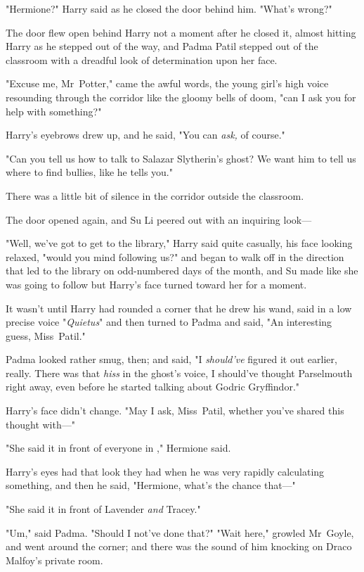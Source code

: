 "Hermione?" Harry said as he closed the door behind him. "What's wrong?"

The door flew open behind Harry not a moment after he closed it, almost hitting
Harry as he stepped out of the way, and Padma Patil stepped out of the
classroom with a dreadful look of determination upon her face.

"Excuse me, Mr~Potter," came the awful words, the young girl's high voice
resounding through the corridor like the gloomy bells of doom, "can I ask you
for help with something?"

Harry's eyebrows drew up, and he said, "You can \emph{ask,} of course."

"Can you tell us how to talk to Salazar Slytherin's ghost? We want him to tell
us where to find bullies, like he tells you."

There was a little bit of silence in the corridor outside the classroom.

The door opened again, and Su Li peered out with an inquiring look—

"Well, we've got to get to the library," Harry said quite casually, his face
looking relaxed, "would you mind following us?" and began to walk off in the
direction that led to the library on odd-numbered days of the month, and Su
made like she was going to follow but Harry's face turned toward her for a
moment.

It wasn't until Harry had rounded a corner that he drew his wand, said in a low
precise voice "\emph{Quietus}" and then turned to Padma and said, "An
interesting guess, Miss~Patil."

Padma looked rather smug, then; and said, "I \emph{should've} figured it out
earlier, really. There was that \emph{hiss} in the ghost's voice, I should've
thought Parselmouth right away, even before he started talking about Godric
Gryffindor."

Harry's face didn't change. "May I ask, Miss~Patil, whether you've shared this
thought with—"

"She said it in front of everyone in \SPHEW," Hermione said.

Harry's eyes had that look they had when he was very rapidly calculating
something, and then he said, "Hermione, what's the chance that—"

"She said it in front of Lavender \emph{and} Tracey."

"Um," said Padma. "Should I not've done that?"
\later
"Wait here," growled Mr~Goyle, and went around the corner; and there was the
sound of him knocking on Draco Malfoy's private room.

